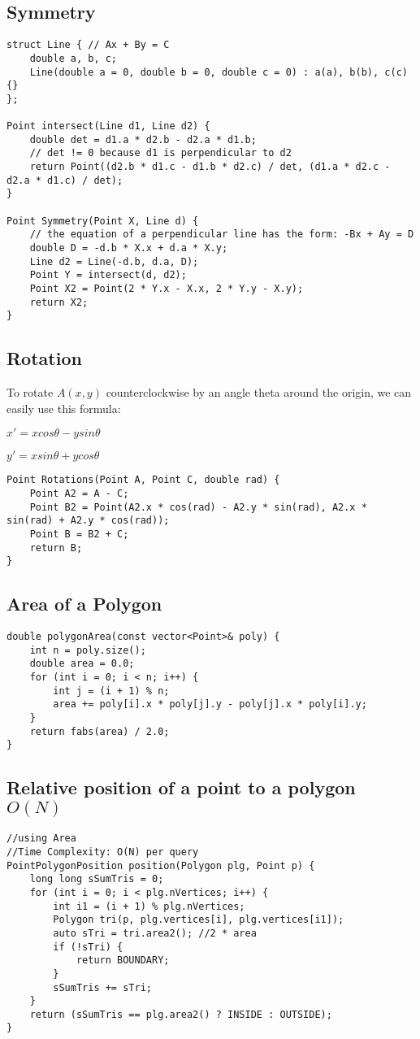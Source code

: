 \documentclass[11pt,a4paper]{article}
\begin{document}
\begin{multicols*}{2}
\subsection{Symmetry}
\begin{lstlisting}
struct Line { // Ax + By = C
    double a, b, c;
    Line(double a = 0, double b = 0, double c = 0) : a(a), b(b), c(c) {}
};

Point intersect(Line d1, Line d2) {
    double det = d1.a * d2.b - d2.a * d1.b;
    // det != 0 because d1 is perpendicular to d2
    return Point((d2.b * d1.c - d1.b * d2.c) / det, (d1.a * d2.c - d2.a * d1.c) / det);
}

Point Symmetry(Point X, Line d) {
    // the equation of a perpendicular line has the form: -Bx + Ay = D
    double D = -d.b * X.x + d.a * X.y;
    Line d2 = Line(-d.b, d.a, D);
    Point Y = intersect(d, d2);
    Point X2 = Point(2 * Y.x - X.x, 2 * Y.y - X.y);
    return X2;
}
\end{lstlisting}

\subsection{Rotation}
To rotate $A(x, y)$ counterclockwise by an angle theta around the origin, we can easily use this formula:

$x' = xcos\theta - ysin\theta$


$y' = xsin\theta + ycos\theta$
\begin{lstlisting}
Point Rotations(Point A, Point C, double rad) {
    Point A2 = A - C;
    Point B2 = Point(A2.x * cos(rad) - A2.y * sin(rad), A2.x * sin(rad) + A2.y * cos(rad));
    Point B = B2 + C;
    return B;
}
\end{lstlisting}

\subsection{Area of a Polygon}
\begin{lstlisting}
double polygonArea(const vector<Point>& poly) {
    int n = poly.size();
    double area = 0.0;
    for (int i = 0; i < n; i++) {
        int j = (i + 1) % n;
        area += poly[i].x * poly[j].y - poly[j].x * poly[i].y;
    }
    return fabs(area) / 2.0;
}
\end{lstlisting}

\subsection{Relative position of a point to a polygon $O(N)$}
\begin{lstlisting}
//using Area
//Time Complexity: O(N) per query 
PointPolygonPosition position(Polygon plg, Point p) {
    long long sSumTris = 0;
    for (int i = 0; i < plg.nVertices; i++) {
        int i1 = (i + 1) % plg.nVertices;
        Polygon tri(p, plg.vertices[i], plg.vertices[i1]);
        auto sTri = tri.area2(); //2 * area
        if (!sTri) {
            return BOUNDARY;
        }
        sSumTris += sTri;
    }
    return (sSumTris == plg.area2() ? INSIDE : OUTSIDE);
}
\end{lstlisting}


\end{multicols*}
\end{document}
